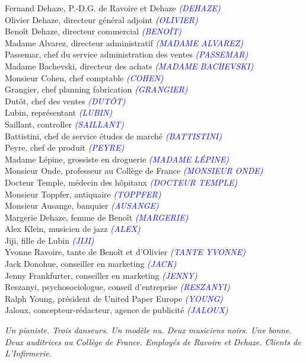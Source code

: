 \documentclass[a4paper]{report}
\newcommand{\annot}[1]{{\footnotesize \textcolor{blue}{\textit{(#1)}}}}
\begin{document}
\begin{center}
Fernand Dehaze, P.-D.G. de Ravoire et Dehaze \annot{DEHAZE}\\
Olivier Dehaze, directeur général adjoint \annot{OLIVIER}\\
Benoît Dehaze, directeur commercial \annot{BENOÎT}\\
Madame Alvarez, directeur administratif \annot{MADAME ALVAREZ}\\
Passemar, chef du service administration des ventes \annot{PASSEMAR}\\
Madame Bachevski, directeur des achats \annot{MADAME BACHEVSKI}\\
Monsieur Cohen, chef comptable \annot{COHEN}\\
Grangier, chef planning fabrication \annot{GRANGIER}\\
Dutôt, chef des ventes \annot{DUTÔT}\\
Lubin, représentant \annot{LUBIN}\\
Saillant, controller \annot{SAILLANT}\\
Battistini, chef de service études de marché \annot{BATTISTINI}\\
Peyre, chef de produit \annot{PEYRE}\\
Madame Lépine, grossiste en droguerie \annot{MADAME LÉPINE}\\
Monsieur Onde, professeur au Collège de France \annot{MONSIEUR ONDE}\\
Docteur Temple, médecin des hôpitaux \annot{DOCTEUR TEMPLE}\\
Monsieur Toppfer, antiquaire \annot{TOPPFER}\\
Monsieur Ausange, banquier \annot{AUSANGE}\\
Margerie Dehaze, femme de Benoît \annot{MARGERIE}\\
Alex Klein, musicien de jazz \annot{ALEX}\\
Jiji, fille de Lubin \annot{JIJI}\\
Yvonne Ravoire, tante de Benoît et d'Olivier \annot{TANTE YVONNE}\\
Jack Donohue, conseiller en marketing \annot{JACK}\\
Jenny Frankfurter, conseiller en marketing \annot{JENNY}\\
Reszanyi, psychosociologue, conseil d'entreprise \annot{RESZANYI}\\
Ralph Young, président de United Paper Europe \annot{YOUNG}\\
Jaloux, concepteur-rédacteur, agence de publicité \annot{JALOUX}\\
\end{center}

\begin{center}
\textit{Un pianiste. Trois danseurs. Un modèle nu. Deux musiciens noirs. Une bonne. Deux auditrices au Collège de France. Employés de Ravoire et Dehaze. Clients de L'Infirmerie.}
\end{center}
\end{document}
